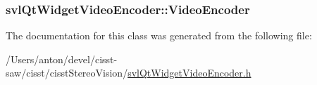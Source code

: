 \subsubsection[{Video\+Encoder}]{ svl\+Qt\+Widget\+Video\+Encoder\+::\+Video\+Encoder}\label{classsvl_qt_widget_video_encoder_a2ed567dc99004fa316aae01879a44994}


The documentation for this class was generated from the following file\+:\begin{DoxyCompactItemize}
\item 
/\+Users/anton/devel/cisst-\/saw/cisst/cisst\+Stereo\+Vision/\hyperlink{svl_qt_widget_video_encoder_8h}{svl\+Qt\+Widget\+Video\+Encoder.\+h}\end{DoxyCompactItemize}
